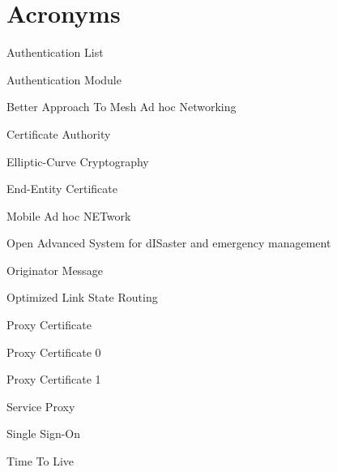 \chapter*{Acronyms}

\begin{acronym}


 {Authentication List}

 {Authentication Module}

 {Better Approach To Mesh Ad hoc Networking}

 {Certificate Authority}





 {Elliptic-Curve Cryptography}

 {End-Entity Certificate}


 {Mobile Ad hoc NETwork}


 {Open Advanced System for dISaster and emergency management}

 {Originator Message}

 {Optimized Link State Routing}


 {Proxy Certificate}

 {Proxy Certificate 0}

 {Proxy Certificate 1}





 {Service Proxy}

 {Single Sign-On}

 {Time To Live}


%

\end{acronym}
